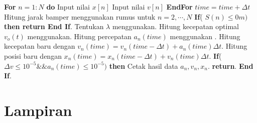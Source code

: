 \documentclass[a4paper,12pt,oneside]{book}
\begin{document}
\begin{algorithm}
 \begin{algorithmic}[1]
    \State {}
	\State \textbf{For }$n=1:N$\textbf{ do} 
	\State \hspace{0.5cm} Input nilai $x[n]$
	\State \hspace{0.5cm} Input nilai $v[n]$
	\State \textbf{EndFor}
	\State {}
	\State \hspace{0.5cm} $time=time +\Delta t$
	\State \hspace{0.5cm} Hitung jarak bamper menggunakan rumus  untuk $n=2,\cdots,N$ 
	\State \hspace{0.5cm} \textbf{If}( $S(n) \leq 0 m)$ \textbf{then return End If}.
	\State \hspace{0.5cm} Tentukan $\lambda$ menggunakan.
	\State \hspace{0.5cm} Hitung kecepatan optimal $v_o(t)$ menggunakan.
	\State \hspace{0.5cm} Hitung percepatan $a_n(time)$ menggunakan .
	\State \hspace{0.5cm} Hitung kecepatan baru dengan $v_n(time)=v_n(time-\Delta t) + a_n(time) \Delta t$.
	\State \hspace{0.5cm} Hitung posisi baru dengan $x_n(time)=x_n(time-\Delta t) + v_n(time) \Delta t$.
	\State \hspace{0.5cm} \textbf{If}( $\Delta v \leq 10^{-5} \&\& a_n(time)\leq 10^{-5})$ \textbf{then}  
    \State \hspace{0.5cm} \hspace{0.5cm} Cetak hasil data $a_n, v_n, x_n$.
	\State \hspace{0.5cm} \hspace{0.5cm} \textbf{return}.
	\State \hspace{0.5cm} \textbf{End If}.
	\EndWhile
	\State {}
 \EndProcedure
 \end{algorithmic}
 \caption{Prosedur simulasi dinamika lalu lintas menggunakan FVDM.}\label{Algo:FVDM}
\end{algorithm}
%

%
\cleardoublepage
{}


%
\cleardoublepage
{}
\chapter*{Lampiran}
\end{document}
